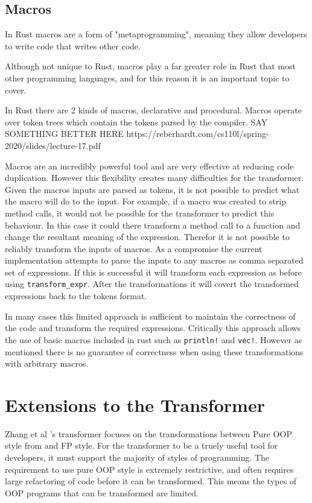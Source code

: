 \documentclass[ oneside,%
                    author={James Elgar},
                    degree={MEng},
                     title={Bidirectional transformer between functional and \\ object-oriented programming in Rust},
                  subtitle={}]{dissertation}
\newcommand{\weixin}{Zhang et al }
\newcommand{\rust}[1]{\texttt{#1}}
\begin{document}
\section{Macros}

In Rust macros are a form of "metaprogramming", meaning they allow developers to write code that writes other code. 

Although not unique to Rust, macros play a far greater role in Rust that most other programming languages, and for this reason it is an important topic to cover. 

In Rust there are 2 kinds of macros, declarative and procedural. Macros operate over token trees which contain the tokens parsed by the compiler. SAY SOMETHING BETTER HERE  https://reberhardt.com/cs110l/spring-2020/slides/lecture-17.pdf

Macros are an incredibly powerful tool and are very effective at reducing code duplication. However this flexibility creates many difficulties for the transformer. Given the macros inputs are parsed as tokens, it is not possible to predict what the macro will do to the input. For example, if a macro was created to strip method calls, it would not be possible for the transformer to predict this behaviour. In this case it could there transform a method call to a function and change the resultant meaning of the expression. 
Therefor it is not possible to reliably transform the inputs of macros. As a compromise the current implementation attempts to parse the inputs to any macros as comma separated set of expressions. If this is successful it will transform each expression as before using \verb|transform_expr|. After the transformations it will covert the transformed expressions back to the tokens format.

In many cases this limited approach is sufficient to maintain the correctness of the code and transform the required expressions. Critically this approach allows the use of basic macros included in rust such as \rust{println!} and \rust{vec!}. However as mentioned there is no guarantee of correctness when using these transformations with arbitrary macros.

\chapter{Extensions to the Transformer}

\weixin's transformer focuses on the transformations between Pure OOP style from \cite{cook} and FP style. For the transformer to be a truely useful tool for developers, it must support the majority of styles of programming. 
The requirement to use pure OOP style is extremely restrictive, and often requires large refactoring of code before it can be transformed.
This means the types of OOP programs that can be transformed are limited.
\end{document}
